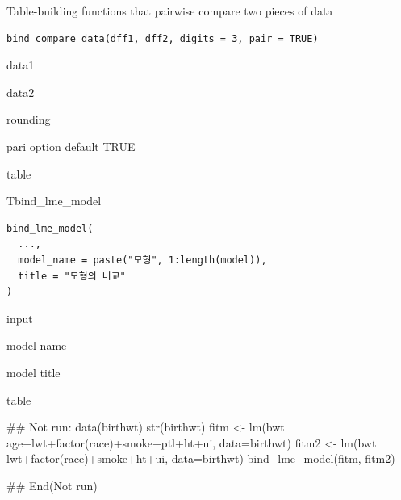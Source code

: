 \documentclass[a4paper]{book}
\begin{document}
%
\begin{Description}
Table-building functions that pairwise compare two pieces of data
\end{Description}
%
\begin{Usage}
\begin{verbatim}
bind_compare_data(dff1, dff2, digits = 3, pair = TRUE)
\end{verbatim}
\end{Usage}
%
\begin{Arguments}
\begin{ldescription}
\item[\code{dff1}] data1

\item[\code{dff2}] data2

\item[\code{digits}] rounding

\item[\code{pair}] pari option default TRUE
\end{ldescription}
\end{Arguments}
%
\begin{Value}
table
\end{Value}

%
\begin{Description}
Tbind\_lme\_model
\end{Description}
%
\begin{Usage}
\begin{verbatim}
bind_lme_model(
  ...,
  model_name = paste("모형", 1:length(model)),
  title = "모형의 비교"
)
\end{verbatim}
\end{Usage}
%
\begin{Arguments}
\begin{ldescription}
\item[\code{...}] input

\item[\code{model\_name}] model name

\item[\code{title}] model title
\end{ldescription}
\end{Arguments}
%
\begin{Value}
table
\end{Value}
%
\begin{Examples}
\begin{ExampleCode}
\#\# Not run: 
data(birthwt)
str(birthwt)
fitm <- lm(bwt ~ age+lwt+factor(race)+smoke+ptl+ht+ui, data=birthwt)
fitm2 <- lm(bwt ~ lwt+factor(race)+smoke+ht+ui, data=birthwt)
bind_lme_model(fitm, fitm2)


## End(Not run)
\end{ExampleCode}
\end{Examples}
\end{document}
